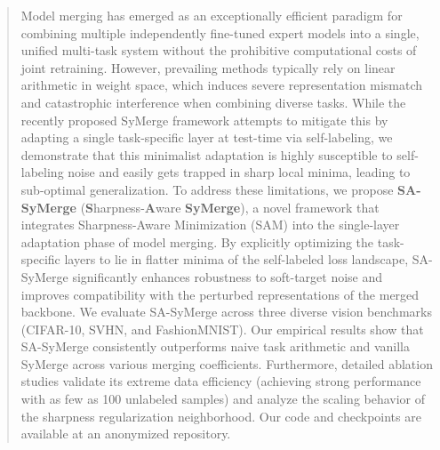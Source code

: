 \documentclass{article}
\theoremstyle{plain}
\theoremstyle{definition}
\theoremstyle{remark}
\begin{document}

\printAffiliationsAndNotice{} 

\begin{abstract}
Model merging has emerged as an exceptionally efficient paradigm for combining multiple independently fine-tuned expert models into a single, unified multi-task system without the prohibitive computational costs of joint retraining. However, prevailing methods typically rely on linear arithmetic in weight space, which induces severe representation mismatch and catastrophic interference when combining diverse tasks. While the recently proposed SyMerge framework attempts to mitigate this by adapting a single task-specific layer at test-time via self-labeling, we demonstrate that this minimalist adaptation is highly susceptible to self-labeling noise and easily gets trapped in sharp local minima, leading to sub-optimal generalization. 
To address these limitations, we propose \textbf{SA-SyMerge} (\textbf{S}harpness-\textbf{A}ware \textbf{SyMerge}), a novel framework that integrates Sharpness-Aware Minimization (SAM) into the single-layer adaptation phase of model merging. By explicitly optimizing the task-specific layers to lie in flatter minima of the self-labeled loss landscape, SA-SyMerge significantly enhances robustness to soft-target noise and improves compatibility with the perturbed representations of the merged backbone. 
We evaluate SA-SyMerge across three diverse vision benchmarks (CIFAR-10, SVHN, and FashionMNIST). Our empirical results show that SA-SyMerge consistently outperforms naive task arithmetic and vanilla SyMerge across various merging coefficients. Furthermore, detailed ablation studies validate its extreme data efficiency (achieving strong performance with as few as 100 unlabeled samples) and analyze the scaling behavior of the sharpness regularization neighborhood. Our code and checkpoints are available at an anonymized repository.
\end{abstract}
\end{document}
